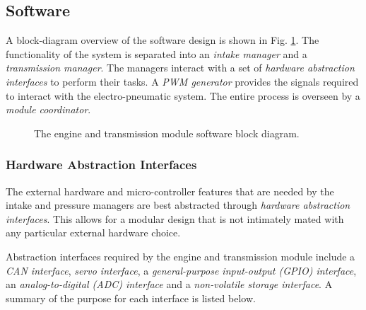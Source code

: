 \subsection{Software}

A block-diagram overview of the software design is shown in Fig. \ref{fig:engine_software_design_block}. The functionality of the system is separated into an \emph{intake manager} and a \emph{transmission manager}. The managers interact with a set of \emph{hardware abstraction interfaces} to perform their tasks. A \emph{PWM generator} provides the signals required to interact with the electro-pneumatic system. The entire process is overseen by a \emph{module coordinator}.

\begin{figure}[H]
	\centering
%	
	\caption{The engine and transmission module software block diagram.}
	\label{fig:engine_software_design_block}
\end{figure}

\subsubsection{Hardware Abstraction Interfaces}

The external hardware and micro-controller features that are needed by the intake and pressure managers are best abstracted through \emph{hardware abstraction interfaces}. This allows for a modular design that is not intimately mated with any particular external hardware choice. 

Abstraction interfaces required by the engine and transmission module include a \emph{CAN interface}, \emph{servo interface}, a \emph{general-purpose input-output (GPIO) interface}, an \emph{analog-to-digital (ADC) interface} and a \emph{non-volatile storage interface}. A summary of the purpose for each interface is listed below.

